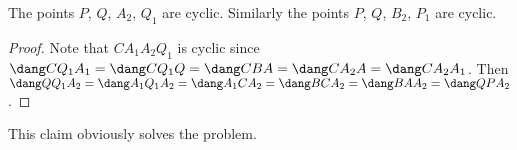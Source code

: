 \begin{claim*}
  The points $P$, $Q$, $A_2$, $Q_1$ are cyclic.
  Similarly the points $P$, $Q$, $B_2$, $P_1$ are cyclic.
\end{claim*}
\begin{proof}
  Note that $CA_1A_2Q_1$ is cyclic since
  $\dang CQ_1A_1 = \dang CQ_1Q = \dang CBA = \dang CA_2A = \dang CA_2A_1$.
  Then $\dang QQ_1A_2 = \dang A_1Q_1A_2 = \dang A_1 C A_2
  = \dang B C A_2 = \dang B A A_2 = \dang Q P A_2$.
\end{proof}

This claim obviously solves the problem.
\pagebreak